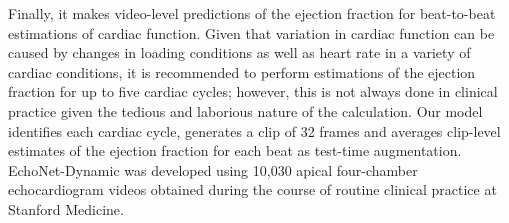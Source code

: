 Finally, it makes video-level predictions of the ejection fraction for beat-to-beat estimations of cardiac function. Given that variation in cardiac function can be caused by changes in loading conditions as well as heart rate in a variety of cardiac conditions, it is recommended to perform estimations of the ejection fraction for up to five cardiac cycles; however, this is not always done in clinical practice given the tedious and laborious nature of the calculation. Our model identifies each cardiac cycle, generates a clip of 32 frames and averages clip-level estimates of the ejection fraction for each beat as test-time augmentation. EchoNet-Dynamic was developed using 10,030 apical four-chamber echocardiogram videos obtained during the course of routine clinical practice at Stanford Medicine.
